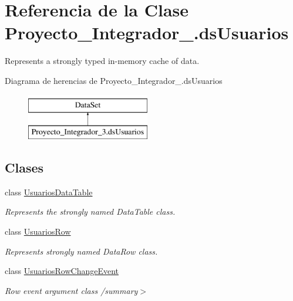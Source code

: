 \hypertarget{class_proyecto___integrador__3_1_1ds_usuarios}{\section{Referencia de la Clase Proyecto\-\_\-\-Integrador\-\_.\-ds\-Usuarios}
\label{class_proyecto___integrador__3_1_1ds_usuarios}
}


Represents a strongly typed in-\/memory cache of data.  


Diagrama de herencias de Proyecto\-\_\-\-Integrador\-\_.\-ds\-Usuarios\begin{figure}[H]
\begin{center}
\leavevmode
\includegraphics[height=2.000000cm]{d7/d52/class_proyecto___integrador__3_1_1ds_usuarios}
\end{center}
\end{figure}
\subsection*{Clases}
\begin{DoxyCompactItemize}
\item 
class \hyperlink{class_proyecto___integrador__3_1_1ds_usuarios_1_1_usuarios_data_table}{Usuarios\-Data\-Table}
\begin{DoxyCompactList}\small\item\em Represents the strongly named Data\-Table class. \end{DoxyCompactList}\item 
class \hyperlink{class_proyecto___integrador__3_1_1ds_usuarios_1_1_usuarios_row}{Usuarios\-Row}
\begin{DoxyCompactList}\small\item\em Represents strongly named Data\-Row class. \end{DoxyCompactList}\item 
class \hyperlink{class_proyecto___integrador__3_1_1ds_usuarios_1_1_usuarios_row_change_event}{Usuarios\-Row\-Change\-Event}
\begin{DoxyCompactList}\small\item\em Row event argument class /summary$>$ \end{DoxyCompactList}\end{DoxyCompactItemize}
